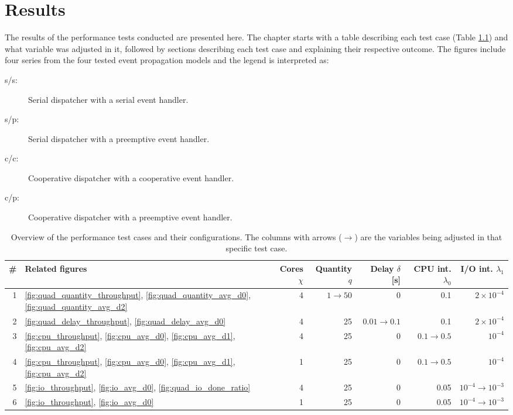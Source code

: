 \chapter{Results}
\label{cha:results}

The results of the performance tests conducted are presented here. The chapter
starts with a table describing each test case (Table \ref{tab:test_overview})
and what variable was adjusted in it, followed by sections describing each test
case and explaining their respective outcome. The figures include four series
from the four tested event propagation models and the legend is interpreted as:

\begin{description}

    \item[s/s:] Serial dispatcher with a serial event handler.
    \item[s/p:] Serial dispatcher with a preemptive event handler.
    \item[c/c:] Cooperative dispatcher with a cooperative event handler.
    \item[c/p:] Cooperative dispatcher with a preemptive event handler.

\end{description}

\bgroup
\def\arraystretch{1.2}
\begin{table}[h!]
    \caption{Overview of the performance test cases and their configurations.
    The columns with arrows ($\rightarrow$) are the variables being adjusted in
    that specific test case.}
    \label{tab:test_overview}
\begin{center}
\begin{tabular}{|r|l|r|r|r|r|r|}
    \hline
    \# & Related figures & Cores $\chi$ & Quantity $q$ & Delay $\delta$ [s] & CPU int. $\lambda_0$ & I/O int. $\lambda_1$ \\
    \hline
    1 & \ref{fig:quad_quantity_throughput}, \ref{fig:quad_quantity_avg_d0},
    \ref{fig:quad_quantity_avg_d2} & 4 & $1 \rightarrow 50$ & 0 & 0.1 & $2
    \times 10^{-4}$ \\
    \hline
    2 & \ref{fig:quad_delay_throughput}, \ref{fig:quad_delay_avg_d0} & 4 & 25 &
    $0.01 \rightarrow 0.1$ & 0.1 & $2 \times 10^{-4}$ \\
    \hline
    3 & \ref{fig:cpu_throughput}, \ref{fig:cpu_avg_d0}, \ref{fig:cpu_avg_d1},
    \ref{fig:cpu_avg_d2} & 4 & 25 & 0 & $0.1 \rightarrow 0.5$ & $10^{-4}$ \\
    \hline
    4 & \ref{fig:cpu_throughput}, \ref{fig:cpu_avg_d0}, \ref{fig:cpu_avg_d1},
    \ref{fig:cpu_avg_d2} & 1 & 25 & 0 & $0.1 \rightarrow 0.5$ & $10^{-4}$ \\
    \hline
    5 & \ref{fig:io_throughput}, \ref{fig:io_avg_d0},
    \ref{fig:quad_io_done_ratio} & 4 & 25 & 0 & 0.05 & $10^{-4} \rightarrow 10^{-3}$ \\
    \hline
    6 & \ref{fig:io_throughput}, \ref{fig:io_avg_d0} & 1 & 25 & 0 & 0.05 & $10^{-4} \rightarrow 10^{-3}$ \\
    \hline
\end{tabular}
\end{center}
\end{table}

